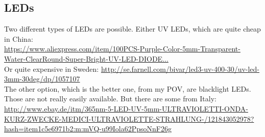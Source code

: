 \documentclass{article}
\begin{document}
\subsection{LEDs}
Two different types of LEDs are possible. Either UV LEDs, which are quite cheap in China:\\
\href{https://www.aliexpress.com/item/100PCS-Purple-Color-5mm-Transparent-Water-ClearRound-Super-Bright-UV-LED-DIODE/32266780769.html?spm=2114.01010208.3.12.tra0j7&ws_ab_test=searchweb0_0,searchweb201602_3_10065_10068_10136_10137_10138_10060_10062_10141_10056_10055_10054_122_10059_10099_10103_10102_10096_10052_10053_10050_10107_10142_10051_10143_10084_10083_10080_10082_10081_10110_10111_10112_10113_10114_10078_10079_10073_10070_10123_10124-10111,searchweb201603_2,afswitch_1,ppcSwitch_5,single_sort_0_default&btsid=93ee4e21-8cbb-4573-8c94-fde0f528a3a4&algo_expid=a530b458-dbb3-4e8e-9b05-e6f5bf8dd6c4-1&algo_pvid=a530b458-dbb3-4e8e-9b05-e6f5bf8dd6c4}{https://www.aliexpress.com/item/100PCS-Purple-Color-5mm-Transparent-Water-ClearRound-Super-Bright-UV-LED-DIODE...}\\
Or quite expensive in Sweden:
\href{http://se.farnell.com/bivar/led3-uv-400-30/uv-led-3mm-30deg/dp/1057107}{http://se.farnell.com/bivar/led3-uv-400-30/uv-led-3mm-30deg/dp/1057107}\\
The other option, which is the better one, from my POV, are blacklight LEDs. Those are not really easily available. But there are some from Italy:
\href{http://www.ebay.de/itm/365nm-5-LED-UV-5mm-ULTRAVIOLETTI-ONDA-KURZ-ZWECKE-MEDICI-ULTRAVIOLETTE-STRAHLUNG-/121843052978?hash=item1c5e6971b2:m:mVQ-u99Iola62PpsoNnF26g}{http://www.ebay.de/itm/365nm-5-LED-UV-5mm-ULTRAVIOLETTI-ONDA-KURZ-ZWECKE-MEDICI-ULTRAVIOLETTE-STRAHLUNG-/121843052978?hash=item1c5e6971b2:m:mVQ-u99Iola62PpsoNnF26g}
\end{document}
